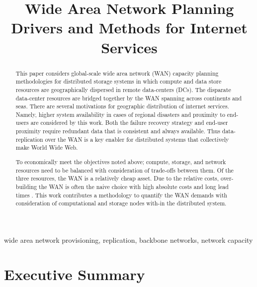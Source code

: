 \documentclass[conference]{IEEEtran}
\begin{document}
\title{Wide Area Network Planning Drivers and Methods for Internet Services\\
}

\author{
}

\maketitle

\begin{abstract}
This paper considers global-scale wide area network (WAN) capacity planning methodologies for distributed storage systems in which compute and data store resources are geographically dispersed in remote data-centers (DCs). The disparate data-center resources are bridged together by the WAN spanning across continents and seas. There are several motivations for geographic distribution of internet services. Namely, higher system availability in cases of regional disasters and proximity to end-users are considered by this work. Both the failure recovery strategy and end-user proximity require redundant data that is consistent and always available. Thus data-replication over the WAN is a key enabler for distributed systems that collectively make World Wide Web. 

To economically meet the objectives noted above; compute, storage, and network resources need to be balanced with consideration of trade-offs between them. Of the three resources, the WAN is a relatively cheap asset. Due to the relative costs, over-building the WAN is often the naive choice with high absolute costs and long lead times \cite{Zhuang}. This work contributes a methodology to quantify the WAN demands with consideration of computational and storage nodes with-in the distributed system.
\end{abstract}

\begin{IEEEkeywords}
wide area network provisioning, replication, backbone networks, network capacity
\end{IEEEkeywords}

\section{Executive Summary}
\end{document}
